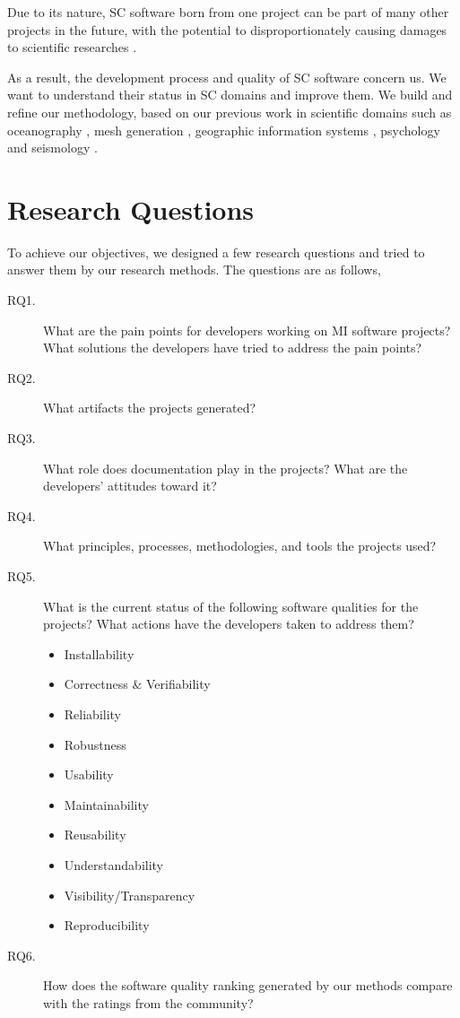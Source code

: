 Due to its nature, SC software born from one project can be part of many other projects in the future, with the potential to disproportionately causing damages to scientific researches \cite{Wilson2014}. 

As a result, the development process and quality of SC software concern us. We want to understand their status in SC domains and improve them. We build and refine our methodology, based on our previous work in scientific domains such as oceanography \cite{Smith2015}, mesh generation \cite{smith2016state}, geographic information systems \cite{smith2018state}, psychology \cite{smith2018statistical} and seismology \cite{Smith2018Seismology}. 

\section{Research Questions}
\label{sec_research_questions}
To achieve our objectives, we designed a few research questions and tried to answer them by our research methods. The questions are as follows,

\begin{description}
\item[RQ1.] What are the pain points for developers working on MI software projects? What solutions the developers have tried to address the pain points?
\item[RQ2.] What artifacts the projects generated?
\item[RQ3.] What role does documentation play in the projects? What are the developers' attitudes toward it?
\item[RQ4.] What principles, processes, methodologies, and tools the projects used?
\item[RQ5.] What is the current status of the following software qualities for the projects? What actions have the developers taken to address them?
\begin{itemize}
	\item Installability
	\item Correctness \& Verifiability
	\item Reliability
	\item Robustness
	\item Usability
	\item Maintainability
	\item Reusability
	\item Understandability
	\item Visibility/Transparency
	\item Reproducibility
\end{itemize}
\item[RQ6.] How does the software quality ranking generated by our methods compare with the ratings from the community?
\end{description}

